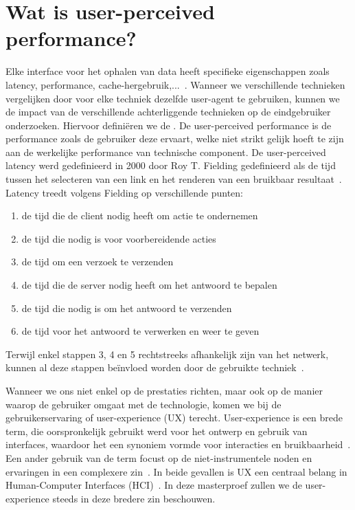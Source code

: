\section{Wat is user-perceived performance?}
\label{sec:what_is_user_perceived_performance}
Elke interface voor het ophalen van data heeft specifieke eigenschappen zoals latency, performance, cache-hergebruik,...~\citep{verborgh16}. Wanneer we verschillende technieken vergelijken door voor elke techniek dezelfde user-agent te gebruiken, kunnen we de impact van de verschillende achterliggende technieken op de eindgebruiker onderzoeken. Hiervoor definiëren we de . De user-perceived performance is de performance zoals de gebruiker deze ervaart, welke niet strikt gelijk hoeft te zijn aan de werkelijke performance van technische component. De user-perceived latency werd gedefinieerd in 2000 door Roy T. Fielding gedefinieerd als de tijd tussen het selecteren van een link en het renderen van een bruikbaar resultaat~\citep{fielding99}. Latency treedt volgens Fielding op verschillende punten: 
\begin{enumerate}
	\item de tijd die de client nodig heeft om actie te ondernemen 
	\item de tijd die nodig is voor voorbereidende acties
	\item de tijd om een verzoek te verzenden
	\item de tijd die de server nodig heeft om het antwoord te bepalen
	\item de tijd die nodig is om het antwoord te verzenden
	\item de tijd voor het antwoord te verwerken en weer te geven
\end{enumerate}
Terwijl enkel stappen 3, 4 en 5 rechtstreeks afhankelijk zijn van het netwerk, kunnen al deze stappen beïnvloed worden door de gebruikte techniek~\citep{fielding99}.

Wanneer we ons niet enkel op de prestaties richten, maar ook op de manier waarop de gebruiker omgaat met de technologie, komen we bij de gebruikerservaring of user-experience (UX) terecht. User-experience is een brede term, die oorspronkelijk gebruikt werd voor het ontwerp en gebruik van interfaces, waardoor het een synoniem vormde voor interacties en bruikbaarheid~\citep{avila11}. Een ander gebruik van de term focust op de niet-instrumentele noden en ervaringen in een complexere zin~\citep{avila11}. In beide gevallen is UX een centraal belang in Human-Computer Interfaces (HCI)~\citep{NíChonchúir2008}. In deze masterproef zullen we de user-experience steeds in deze bredere zin beschouwen. 

